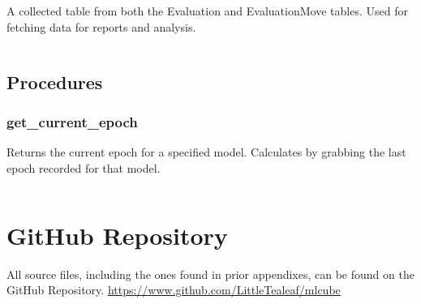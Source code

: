 \documentclass[12pt]{article}
\begin{document}
A collected table from both the Evaluation and EvaluationMove tables. Used for fetching data for reports and analysis.

\inputminted{SQL}{../../sql/views/EvaluationData.sql}

\subsection{Procedures}

\subsubsection{get\_current\_epoch}

Returns the current epoch for a specified model. Calculates by grabbing the last epoch recorded for that model.

\inputminted{SQL}{../../sql/procedures/get_current_epoch.sql}

\section{GitHub Repository}

All source files, including the ones found in prior appendixes, can be found on the GitHub Repository. \url{https://www.github.com/LittleTealeaf/mlcube}
\end{document}
